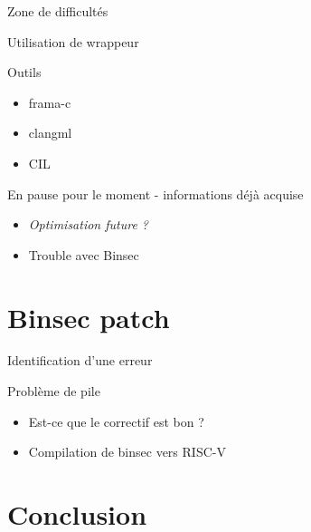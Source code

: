 \documentclass[A4,svgnames,9pt,aspectratio=169]{beamer}
\begin{document}
\begin{frame}{Zone de difficultés}
\end{frame}


\begin{frame}{Utilisation de wrappeur}

  \begin{block}{Outils}
    \begin{itemize}
      \item frama-c
      \item clangml
      \item CIL
    \end{itemize}    
  \end{block}
  \pause
  En pause pour le moment - informations déjà acquise
  \begin{itemize}
    \item \textit{Optimisation future ?}
    \item Trouble avec Binsec
  \end{itemize}
  
\end{frame}


\section{Binsec patch}
\frame{\sectionpage}

\begin{frame}{Identification d'une erreur}
  \begin{block}{Problème de pile}
    \begin{itemize}
      \item Est-ce que le correctif est bon ?
      \item Compilation de binsec vers RISC-V
    \end{itemize}
  \end{block}
\end{frame}


\section{Conclusion}
\frame{\sectionpage}
\end{document}

